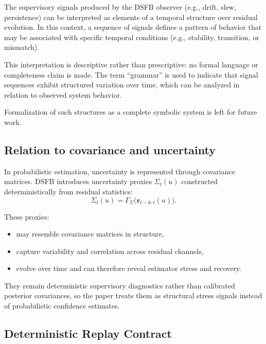 \documentclass[11pt,letterpaper]{article}
\theoremstyle{gcresult}
\theoremstyle{definition}
\begin{document}
The supervisory signals produced by the DSFB observer (e.g., drift, slew, persistence) can be interpreted as elements of a temporal structure over residual evolution. In this context, a sequence of signals defines a pattern of behavior that may be associated with specific temporal conditions (e.g., stability, transition, or mismatch).

This interpretation is descriptive rather than prescriptive: no formal language or completeness claim is made. The term “grammar” is used to indicate that signal sequences exhibit structured variation over time, which can be analyzed in relation to observed system behavior.

Formalization of such structures as a complete symbolic system is left for future work.


\subsection{Relation to covariance and uncertainty}

In probabilistic estimation, uncertainty is represented through covariance matrices. DSFB introduces uncertainty proxies $\Sigma_t(u)$ constructed deterministically from residual statistics:
\begin{equation}
\Sigma_t(u)=\Gamma_\Sigma\!\bigl(\mathbf{r}_{t-k:t}(u)\bigr).
\end{equation}

These proxies:
\begin{itemize}[leftmargin=1.5em]
    \item may resemble covariance matrices in structure,
    \item capture variability and correlation across residual channels,
    \item evolve over time and can therefore reveal estimator stress and recovery.
\end{itemize}

They remain deterministic supervisory diagnostics rather than calibrated posterior covariances, so the paper treats them as structural stress signals instead of probabilistic confidence estimates.


\subsection{Deterministic Replay Contract}
\end{document}

